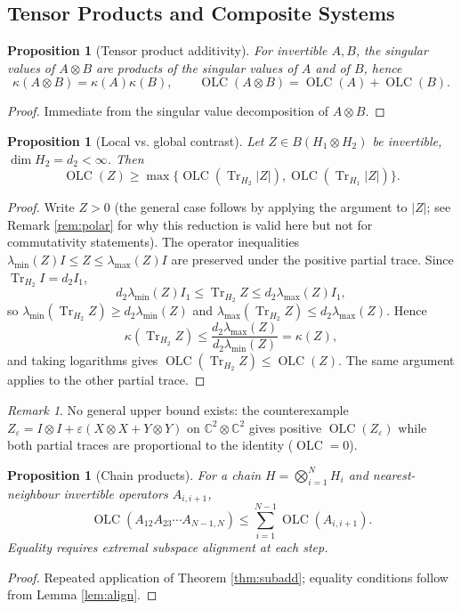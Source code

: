 \documentclass{article}
\newtheorem{proposition}[theorem]{Proposition}
\theoremstyle{remark}
\newtheorem{remark}[theorem]{Remark}
\providecommand{\QLC}{\operatorname{OLC}}
\begin{document}
\subsection{Tensor Products and Composite Systems}

\begin{proposition}[Tensor product additivity]\label{prop:tensor-add}
For invertible $A,B$, the singular values of $A\otimes B$ are products of the singular values of $A$ and of $B$, hence
\[
\kappa(A\otimes B)=\kappa(A)\kappa(B), \qquad \QLC(A\otimes B)=\QLC(A)+\QLC(B).
\]
\end{proposition}
\begin{proof}
Immediate from the singular value decomposition of $A\otimes B$.
\end{proof}

\begin{proposition}[Local vs. global contrast]\label{prop:local-global}
Let $Z\in B(H_1\otimes H_2)$ be invertible, $\dim H_2=d_2<\infty$. Then
\[
\QLC(Z) \ge \max\{\QLC(\operatorname{Tr}_{H_2}|Z|), \QLC(\operatorname{Tr}_{H_1}|Z|)\}.
\]
\end{proposition}
\begin{proof}
Write $Z>0$ (the general case follows by applying the argument to $|Z|$; see Remark \ref{rem:polar} for why this reduction is valid here but not for commutativity statements). The operator inequalities $\lambda_{\min}(Z)I\le Z\le\lambda_{\max}(Z)I$ are preserved under the positive partial trace. Since $\operatorname{Tr}_{H_2}I=d_2I_1$,
\[
d_2\lambda_{\min}(Z)I_1 \le \operatorname{Tr}_{H_2}Z \le d_2\lambda_{\max}(Z)I_1,
\]
so $\lambda_{\min}(\operatorname{Tr}_{H_2}Z)\ge d_2\lambda_{\min}(Z)$ and $\lambda_{\max}(\operatorname{Tr}_{H_2}Z)\le d_2\lambda_{\max}(Z)$. Hence
\[
\kappa(\operatorname{Tr}_{H_2}Z) \le \frac{d_2\lambda_{\max}(Z)}{d_2\lambda_{\min}(Z)} = \kappa(Z),
\]
and taking logarithms gives $\QLC(\operatorname{Tr}_{H_2}Z)\le\QLC(Z)$. The same argument applies to the other partial trace.
\end{proof}

\begin{remark}
No general upper bound exists: the counterexample $Z_\varepsilon = I\otimes I + \varepsilon(X\otimes X+Y\otimes Y)$ on $\mathbb{C}^2\otimes\mathbb{C}^2$ gives positive $\QLC(Z_\varepsilon)$ while both partial traces are proportional to the identity ($\QLC=0$).
\end{remark}

\begin{proposition}[Chain products]
For a chain $H=\bigotimes_{i=1}^N H_i$ and nearest-neighbour invertible operators $A_{i,i+1}$,
\[
\QLC(A_{12}A_{23}\cdots A_{N-1,N}) \le \sum_{i=1}^{N-1}\QLC(A_{i,i+1}).
\]
Equality requires extremal subspace alignment at each step.
\end{proposition}
\begin{proof}
Repeated application of Theorem \ref{thm:subadd}; equality conditions follow from Lemma \ref{lem:align}.
\end{proof}
\end{document}
